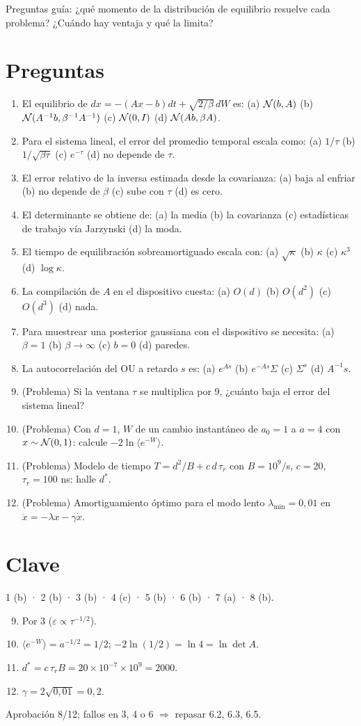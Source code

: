 \documentclass[11pt,a4paper]{article}
\begin{document}
\noindent Preguntas guía: ¿qué momento de la distribución de equilibrio resuelve cada problema? ¿Cuándo hay ventaja y qué la limita?
\section*{Preguntas}
\begin{enumerate}
\item El equilibrio de $dx=-(Ax-b)dt+\sqrt{2/\beta}\,dW$ es: (a) $\mathcal{N}(b,A)$ (b) $\mathcal{N}(A^{-1}b,\beta^{-1}A^{-1})$ (c) $\mathcal{N}(0,I)$ (d) $\mathcal{N}(A b,\beta A)$.
\item Para el sistema lineal, el error del promedio temporal escala como: (a) $1/\tau$ (b) $1/\sqrt{\beta\tau}$ (c) $e^{-\tau}$ (d) no depende de $\tau$.
\item El error relativo de la inversa estimada desde la covarianza: (a) baja al enfriar (b) no depende de $\beta$ (c) sube con $\tau$ (d) es cero.
\item El determinante se obtiene de: (a) la media (b) la covarianza (c) estadísticas de trabajo vía Jarzynski (d) la moda.
\item El tiempo de equilibración sobreamortiguado escala con: (a) $\sqrt\kappa$ (b) $\kappa$ (c) $\kappa^3$ (d) $\log\kappa$.
\item La compilación de $A$ en el dispositivo cuesta: (a) $O(d)$ (b) $O(d^2)$ (c) $O(d^3)$ (d) nada.
\item Para muestrear una posterior gaussiana con el dispositivo se necesita: (a) $\beta=1$ (b) $\beta\to\infty$ (c) $b=0$ (d) paredes.
\item La autocorrelación del OU a retardo $s$ es: (a) $e^{As}$ (b) $e^{-As}\Sigma$ (c) $\Sigma^s$ (d) $A^{-1}s$.
\item (Problema) Si la ventana $\tau$ se multiplica por 9, ¿cuánto baja el error del sistema lineal?
\item (Problema) Con $d=1$, $W$ de un cambio instantáneo de $a_0=1$ a $a=4$ con $x\sim\mathcal{N}(0,1)$: calcule $-2\ln\langle e^{-W}\rangle$.
\item (Problema) Modelo de tiempo $T=d^2/B+c\,d\,\tau_r$ con $B=10^9$/s, $c=20$, $\tau_r=100$ ns: halle $d^\ast$.
\item (Problema) Amortiguamiento óptimo para el modo lento $\lambda_{\min}=0{,}01$ en $\ddot x=-\lambda x-\gamma\dot x$.
\end{enumerate}
\newpage
\section*{Clave}
1 (b) · 2 (b) · 3 (b) · 4 (c) · 5 (b) · 6 (b) · 7 (a) · 8 (b).
\begin{enumerate}\setcounter{enumi}{8}
\item Por 3 ($\varepsilon\propto\tau^{-1/2}$).
\item $\langle e^{-W}\rangle=a^{-1/2}=1/2$; $-2\ln(1/2)=\ln4=\ln\det A$.
\item $d^\ast=c\,\tau_rB=20\times10^{-7}\times10^9=2000$.
\item $\gamma=2\sqrt{0{,}01}=0{,}2$.
\end{enumerate}
Aprobación 8/12; fallos en 3, 4 o 6 $\Rightarrow$ repasar 6.2, 6.3, 6.5.
\end{document}
